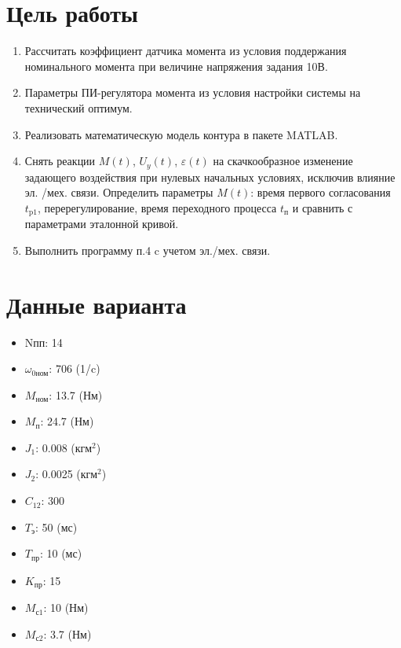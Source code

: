 \section{Цель работы}
\begin{enumerate}
    \item Рассчитать коэффициент датчика момента из условия поддержания номинального
    момента при величине напряжения задания 10В.
    \item Параметры ПИ-регулятора момента из условия настройки системы на
    технический оптимум.
    \item Реализовать математическую модель контура в пакете MATLAB.
    \item Снять реакции $M(t)$, $U_y(t)$, $\varepsilon(t)$ на скачкообразное изменение задающего воздействия
    при нулевых начальных условиях, исключив влияние эл. /мех. связи. Определить
    параметры $M(t)$: время первого согласования $t_\text{p1}$, перерегулирование, время переходного
    процесса $t_\text{п}$ и сравнить с параметрами эталонной кривой.
    \item Выполнить программу п.4 c учетом эл./мех. связи.
\end{enumerate}



\section{Данные варианта}
\begin{itemize}
    \item Nпп: 14
    \item $\omega_\text{0ном}$: 706 (1/c)
    \item $M_\text{ном}$: 13.7 (Нм)
    \item $M_\text{п}$: 24.7 (Нм)
    \item $J_\text{1}$: 0.008 (кгм$^2$)
    \item $J_\text{2}$: 0.0025 (кгм$^2$)
    \item $C_\text{12}$: 300
    \item $T_\text{э}$: 50 (мс)
    \item $T_\text{пр}$: 10 (мс)
    \item $K_\text{пр}$: 15
    \item $M_\text{с1}$: 10 (Нм)
    \item $M_\text{с2}$: 3.7 (Нм)
\end{itemize}
\newpage